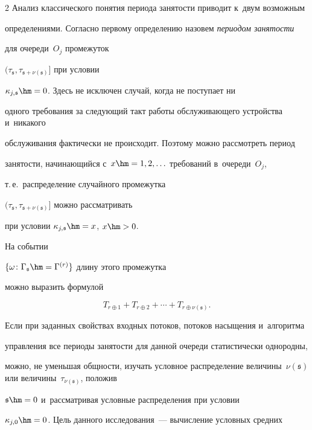 \begin{multicols}{2}
Анализ классического понятия периода занятости приводит к~двум возможным

определениями. Согласно первому определению назовем \textit{периодом занятости}

для очереди~$O_j$ промежуток

$(\tau_{\mathfrak s}, \tau_{\mathfrak s+\nu(\mathfrak s)}]$ при условии

$\kappa_{j,\mathfrak s}\hm=0$. Здесь не исключен случай, когда не поступает ни

одного требования за следующий такт работы обслуживающего устройства и~никакого

обслуживания фактически не происходит.  Поэтому можно рассмотреть период

занятости, начинающийся с~$x\hm=1, 2, \ldots$ требований в~очереди~$O_j$,

т.\,е.\ распределение случайного промежутка

$(\tau_{\mathfrak s}, \tau_{\mathfrak s+\nu(\mathfrak s)}]$ можно рассматривать

при условии $\kappa_{j,\mathfrak s}\hm=x$, $x\hm>0$.

На событии

$\{\omega\colon \Gamma_{\mathfrak s}\hm=\Gamma^{(r)}\}$ длину этого промежутка

можно выразить формулой

$$

T_{r\oplus1}+T_{r\oplus2}+\cdots+T_{r\oplus \nu(\mathfrak s)}.

$$

Если при заданных свойствах входных потоков, потоков насыщения и~алгоритма

управления все периоды занятости для данной очереди статистически однородны,

можно, не уменьшая общ\-ности, \mbox{изучать} условное распределение величины~$\nu(\mathfrak s)$ или величины~$\tau_{\nu(\mathfrak s)}$, положив

$\mathfrak{s}\hm=0$ и~рассматривая условные распределения при условии

$\kappa_{j,0}\hm=0$. Цель данного исследования~--- вычисление условных \mbox{средних}



\vspace*{-6pt}



\noindent

\begin{multline*}


\end{multline*}
\end{multicols}
